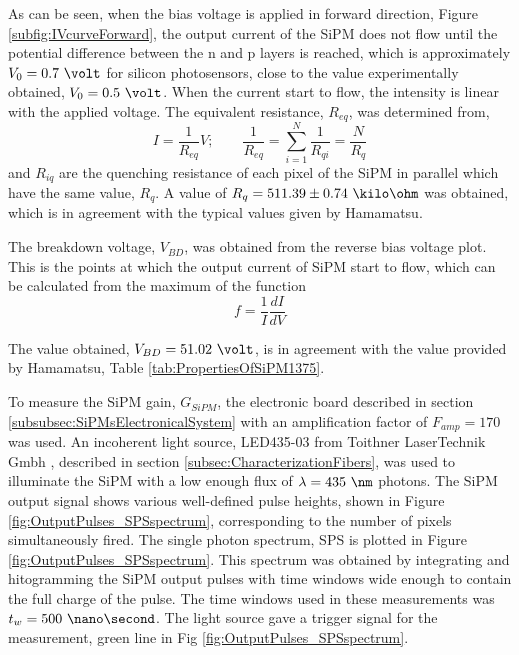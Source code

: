 As can be seen, when the bias voltage is applied in forward direction, Figure \ref{subfig:IVcurveForward}, the output current of the SiPM does not flow until the potential difference between the n and p layers is reached, which is approximately $V_0=0.7~\volt$ for silicon photosensors, close to the value experimentally obtained, $V_0= 0.5~\volt$. When the current start to flow, the intensity is linear with the applied voltage. The equivalent resistance, $R_{eq}$, was determined from, 
\begin{equation}
I=\frac{1}{R_{eq}}V;  \qquad \frac{1}{R_{eq}} = \sum_{i=1}^{N}\frac{1}{R_{qi}}= \frac{N}{R_{q}}
\label{QuenchingResistance}
\end{equation}
and $R_{iq}$ are the quenching resistance of each pixel of the SiPM in parallel which have the same value, $R_{q}$. A value of $R_{q}= 511.39 \pm 0.74~\kilo\ohm$ was obtained, which is in agreement with the typical values given by Hamamatsu.

The breakdown voltage, $V_{BD}$, was obtained from the reverse bias voltage plot. This is the points at which the output current of SiPM start to flow, which can be calculated from the maximum of the function 
\begin{equation}
f=\frac{1}{I}\frac{dI}{dV}
\label{BreakDownVoltageFunction}
\end{equation}

The value obtained, $V_{BD}=51.02~\volt$, is in agreement with the value provided by Hamamatsu, Table \ref{tab:PropertiesOfSiPM1375}.

To measure the SiPM gain, $G_{SiPM}$, the electronic board described in section \ref{subsubsec:SiPMsElectronicalSystem} with an amplification factor of $F_{amp}=170$ was used. An incoherent light source, LED435-03 from Toithner LaserTechnik Gmbh \cite{LEDRLT}, described in section \ref{subsec:CharacterizationFibers}, was used to illuminate the SiPM with a low enough flux of $\lambda= 435~\nm$ photons. The SiPM output signal shows various well-defined pulse heights, shown in Figure \ref{fig:OutputPulses_SPSspectrum}, corresponding to the number of pixels simultaneously fired. The single photon spectrum, SPS is plotted in Figure \ref{fig:OutputPulses_SPSspectrum}. This spectrum was obtained by integrating and hitogramming the SiPM output pulses with time windows wide enough to contain the full charge of the pulse. The time windows used in these measurements was $t_w= 500~\nano\second$. The light source gave a trigger signal for the measurement, green line in Fig \ref{fig:OutputPulses_SPSspectrum}.

